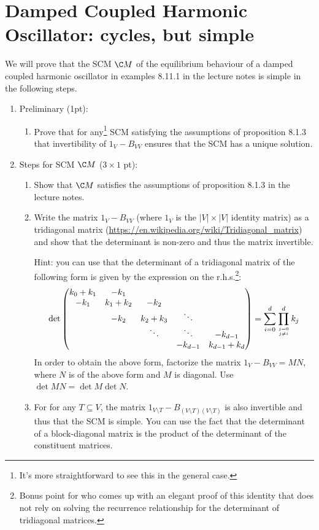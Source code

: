 \section{Damped Coupled Harmonic Oscillator: cycles, but simple}
We will prove that the SCM $\C M$ of the equilibrium behaviour of a damped coupled harmonic oscillator in examples 8.11.1 in the lecture notes is simple in the following steps.

\begin{enumerate}
\item Preliminary (1pt):
\begin{enumerate}
	\item Prove that for any\footnote{It's more straightforward to see this in the general case.} SCM satisfying the assumptions of proposition 8.1.3 that invertibility of $1_{V}-B_{VV}$ ensures that the SCM has a unique solution.
\end{enumerate}

\item Steps for SCM $\C M$ ($3 \times 1$ pt):
\begin{enumerate}
	\item Show that $\C M$ satisfies the assumptions of proposition 8.1.3 in the lecture notes.
	\item Write the matrix $1_{V}-B_{VV}$ (where $1_V$ is the $|V|\times |V|$ identity matrix) as a tridiagonal matrix (\url{https://en.wikipedia.org/wiki/Tridiagonal_matrix}) and show that the determinant is non-zero and thus the matrix invertible.

	Hint: you can use that the determinant of a tridiagonal matrix of the following
form is given by the expression on the r.h.s.\footnote{Bonus point for who comes up with an elegant proof of this identity that does not rely on solving the recurrence relationship for the determinant of tridiagonal matrices.}:
  $$\det \begin{pmatrix}
    k_0+k_1 & -k_1       &           &         & \\
    -k_1     & k_1 + k_2 & -k_2       &         & \\
            & -k_2       & k_2 + k_3 & \ddots  & \\
            &           & \ddots    & \ddots  & -k_{d-1} \\
            &           &           & -k_{d-1} & k_{d-1} + k_d \\
  \end{pmatrix} = \sum_{i=0}^d \prod_{j=0 \atop j\ne i}^d k_j
  $$
  In order to obtain the above form, factorize the matrix $1_{V}-B_{VV}=MN$, where $N$ is of the above form and $M$ is diagonal. Use $\det MN=\det M \det N$.
	\item For for any $T \subseteq V$, the matrix $1_{V \setminus T}-B_{(V \setminus T)(V \setminus T)}$ is also invertible and thus that the SCM is simple. You can use the fact that the determinant of a block-diagonal matrix is the product of the determinant of the constituent matrices.
\end{enumerate}
\end{enumerate}
